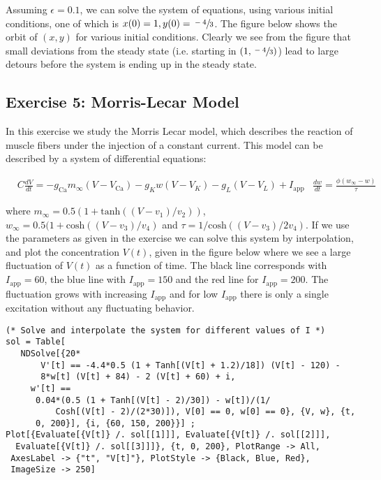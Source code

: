 \documentclass[11pt,a4paper,onecolumn]{article}
\begin{document}
Assuming $\epsilon = 0.1$, we can solve the system of equations, using various initial conditions, one of which is $x(0) = 1, y(0) = \sfrac{-4}{3}$. The figure below shows the orbit of $(x,y)$ for various initial conditions. Clearly we see from the figure that small deviations from the steady state (i.e. starting in $(1,\sfrac{-4}{3})$) lead to large detours before the system is ending up in the steady state. 

\begin{figure}[H]
  \centering
\end{figure}

\subsection{Exercise 5: Morris-Lecar Model}

In this exercise we study the Morris Lecar model, which describes the reaction of muscle fibers under the injection of a constant current. This model can be described by a system of differential equations:

\begin{align*}
  &C \frac{dV}{dt} = -g_{\text{Ca}} m_{\infty} (V - V_{\text{Ca}}) - g_K w (V - V_K) - g_L (V - V_L) + I_{\text{app}} \nonumber
  &\frac{dw}{dt} = \frac{\phi (w_\infty - w)}{\tau}
\end{align*}

where $m_\infty = 0.5(1 + \text{tanh}((V-v_1)/v_2))$, $w_\infty = 0.5(1 + \text{cosh}((V-v_3)/v_4)$ and $\tau = 1/\text{cosh}((V-v_3)/2v_4)$. If we use the parameters as given in the exercise we can solve this system by interpolation, and plot the concentration $V(t)$, given in the figure below where we see a large fluctuation of $V(t)$ as a function of time. The black line corresponds with $I_{\text{app}} = 60$, the blue line with $I_{\text{app}} = 150$ and the red line for $I_{\text{app}} = 200$. The fluctuation grows with increasing $I_{\text{app}}$ and for low $I_{\text{app}}$ there is only a single excitation without any fluctuating behavior.

\begin{lstlisting}[mathescape]
(* Solve and interpolate the system for different values of I *)
sol = Table[
   NDSolve[{20*
       V'[t] == -4.4*0.5 (1 + Tanh[(V[t] + 1.2)/18]) (V[t] - 120) - 
       8*w[t] (V[t] + 84) - 2 (V[t] + 60) + i, 
     w'[t] == 
      0.04*(0.5 (1 + Tanh[(V[t] - 2)/30]) - w[t])/(1/
          Cosh[(V[t] - 2)/(2*30)]), V[0] == 0, w[0] == 0}, {V, w}, {t,
      0, 200}], {i, {60, 150, 200}}] ;
Plot[{Evaluate[{V[t]} /. sol[[1]]], Evaluate[{V[t]} /. sol[[2]]], 
  Evaluate[{V[t]} /. sol[[3]]]}, {t, 0, 200}, PlotRange -> All, 
 AxesLabel -> {"t", "V[t]"}, PlotStyle -> {Black, Blue, Red}, 
 ImageSize -> 250]
\end{lstlisting}
\end{document}
